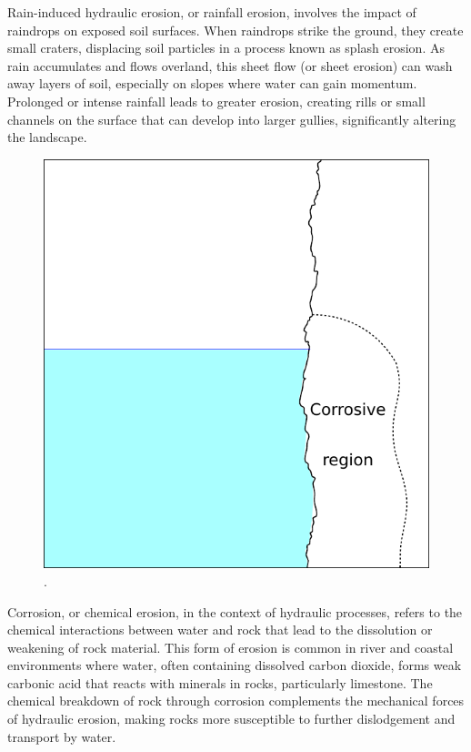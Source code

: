 
Rain-induced hydraulic erosion, or rainfall erosion, involves the impact of raindrops on exposed soil surfaces. When raindrops strike the ground, they create small craters, displacing soil particles in a process known as splash erosion. As rain accumulates and flows overland, this sheet flow (or sheet erosion) can wash away layers of soil, especially on slopes where water can gain momentum. Prolonged or intense rainfall leads to greater erosion, creating rills or small channels on the surface that can develop into larger gullies, significantly altering the landscape.


\begin{figure}
    \includegraphics[width=\linewidth]{corrosion_erosion.pdf}
    \caption{.}
    \label{fig:erosion_corrosion-erosion}
\end{figure}

Corrosion, or chemical erosion, in the context of hydraulic processes, refers to the chemical interactions between water and rock that lead to the dissolution or weakening of rock material. This form of erosion is common in river and coastal environments where water, often containing dissolved carbon dioxide, forms weak carbonic acid that reacts with minerals in rocks, particularly limestone. The chemical breakdown of rock through corrosion complements the mechanical forces of hydraulic erosion, making rocks more susceptible to further dislodgement and transport by water.

